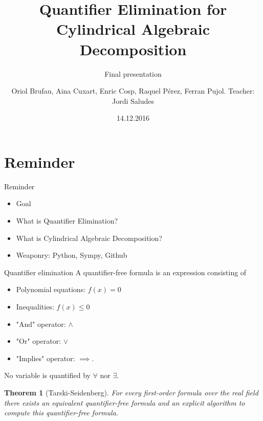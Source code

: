 \documentclass{beamer}
\title[QEPCAD]{Quantifier Elimination for Cylindrical Algebraic Decomposition}
\subtitle{Final presentation}
\author[]{Oriol Brufau, Aina Cuxart, Enric Cosp, Raquel Pérez, Ferran Pujol. Teacher: Jordi Saludes}
\institute[FME - UPC] %
\date{14.12.2016}
\newtheorem{thm}{Theorem}
\begin{document}

\frame{\titlepage}
\section{Reminder}
\begin{frame}{Reminder}
    \begin{itemize}
        \item Goal
        \item What is Quantifier Elimination?
        \item What is Cylindrical Algebraic Decomposition?
        \item Weaponry: Python, Sympy, Github
    \end{itemize}
\end{frame}

\begin{frame}{Quantifier elimination}
    A quantifier-free formula is an expression consisting of
    \begin{itemize}
        \item Polynomial equations: $f(x) = 0$
        \item Inequalities: $f(x) \leq 0$
        \item "And" operator: $\wedge$
        \item "Or" operator: $\vee$
        \item "Implies" operator: $\implies$.
    \end{itemize}
    
    No variable is quantified by $\forall$ nor $\exists$.
    
    \begin{thm}[Tarski-Seidenberg]
        For every first-order formula over the real field there exists an equivalent quantifier-free formula and an explicit algorithm to compute this quantifier-free formula.
    \end{thm}
\end{frame}
\end{document}
